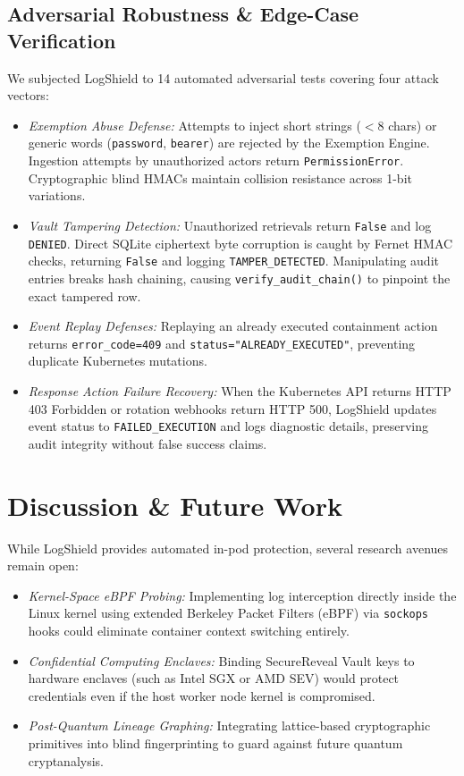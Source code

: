 \documentclass[conference]{IEEEtran}
\begin{document}
\subsection{Adversarial Robustness \& Edge-Case Verification}
We subjected LogShield to 14 automated adversarial tests covering four attack vectors:
\begin{itemize}
    \item \textit{Exemption Abuse Defense:} Attempts to inject short strings ($<8$ chars) or generic words (\texttt{password}, \texttt{bearer}) are rejected by the Exemption Engine. Ingestion attempts by unauthorized actors return \texttt{PermissionError}. Cryptographic blind HMACs maintain collision resistance across 1-bit variations.
    \item \textit{Vault Tampering Detection:} Unauthorized retrievals return \texttt{False} and log \texttt{DENIED}. Direct SQLite ciphertext byte corruption is caught by Fernet HMAC checks, returning \texttt{False} and logging \texttt{TAMPER\_DETECTED}. Manipulating audit entries breaks hash chaining, causing \texttt{verify\_audit\_chain()} to pinpoint the exact tampered row.
    \item \textit{Event Replay Defenses:} Replaying an already executed containment action returns \texttt{error\_code=409} and \texttt{status="ALREADY\_EXECUTED"}, preventing duplicate Kubernetes mutations.
    \item \textit{Response Action Failure Recovery:} When the Kubernetes API returns HTTP 403 Forbidden or rotation webhooks return HTTP 500, LogShield updates event status to \texttt{FAILED\_EXECUTION} and logs diagnostic details, preserving audit integrity without false success claims.
\end{itemize}


\section{Discussion \& Future Work}
While LogShield provides automated in-pod protection, several research avenues remain open:
\begin{itemize}
    \item \textit{Kernel-Space eBPF Probing:} Implementing log interception directly inside the Linux kernel using extended Berkeley Packet Filters (eBPF) via \texttt{sockops} hooks could eliminate container context switching entirely.
    \item \textit{Confidential Computing Enclaves:} Binding SecureReveal Vault keys to hardware enclaves (such as Intel SGX or AMD SEV) would protect credentials even if the host worker node kernel is compromised.
    \item \textit{Post-Quantum Lineage Graphing:} Integrating lattice-based cryptographic primitives into blind fingerprinting to guard against future quantum cryptanalysis.
\end{itemize}
\end{document}
